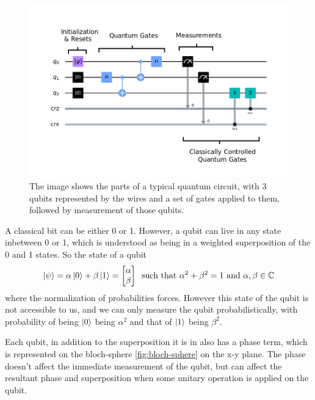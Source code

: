 \begin{figure}[ht]
    \centering
    \includegraphics[width=0.8\linewidth]{figures/quantum/quantum_circuit_example.png}
    \caption[Typical Quantum Circuit]{The image shows the parts of a typical quantum circuit, with 3 qubits represented by the wires and a set of gates applied to them, followed by measurement of those qubits.}
    \label{fig:quantum-circuit-example}
\end{figure}


A classical bit can be either 0 or 1. However, a qubit can live in any state inbetween 0 or 1, which is understood as being in a weighted superposition of the 0 and 1 states. So the state of a qubit 
\begin{equation}
    \ket{\psi} = \alpha \ket{0} + \beta \ket{1} = \begin{bmatrix}\alpha \\ \beta\end{bmatrix} \;\;\text{such that }\alpha^2 + \beta^2 = 1 \text{ and } \alpha, \beta \in \mathbb{C}
\end{equation}
where the normalization of probabilities forces. However this state of the qubit is not accessible to us, and we can only measure the qubit probabilistically, with probability of being $\ket{0}$ being $\alpha^2$ and that of $\ket{1}$ being $\beta^2$.

Each qubit, in addition to the superposition it is in also has a phase term, which is represented on the bloch-sphere \ref{fig:bloch-sphere} on the x-y plane. The phase doesn't affect the immediate measurement of the qubit, but can affect the resultant phase and superposition when some unitary operation is applied on the qubit.

